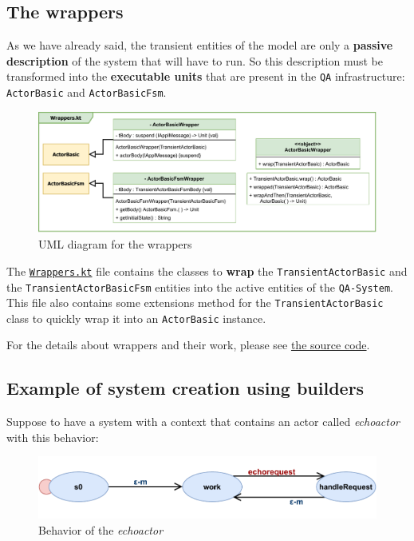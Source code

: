 \subsection{The wrappers}

As we have already said, the transient entities of the model are only a \textbf{passive description} of the system that will have to run. So this description must be transformed into the \textbf{executable units} that are present in the \texttt{QA} infrastructure: \texttt{ActorBasic} and \texttt{ActorBasicFsm}.

\begin{figure}[h]
	\centering
	\includegraphics[width=\textwidth]{img/[UML]it.unibo.kaktor.builders_wrapper}
	\caption{UML diagram for the wrappers}
	\label{fig::builders_wrapper}
\end{figure}

The \href{https://github.com/LM-96/QA-Extensions/blob/main/it.unibo.qakactor/src/main/kotlin/builders/Wrappers.kt}{\texttt{Wrappers.kt}} file contains the classes to \textbf{wrap} the \texttt{TransientActorBasic} and the \texttt{TransientActorBasicFsm} entities into the active entities of the \texttt{QA-System}.
This file also contains some extensions method for the \texttt{TransientActorBasic} class to quickly wrap it into an \texttt{ActorBasic} instance.

For the details about wrappers and their work, please see \href{https://github.com/LM-96/QA-Extensions/blob/main/it.unibo.qakactor/src/main/kotlin/builders/Wrappers.kt}{the source code}.

\subsection{Example of system creation using builders}

Suppose to have a system with a context that contains an actor called \textit{echoactor} with this behavior:
\begin{figure}[h]
	\centering
	\includegraphics[width=\textwidth]{img/[EG]simple_echo_actor_diagram}
	\caption{Behavior of the \textit{echoactor}}
	\label{fig::echo_actor_example}
\end{figure}

